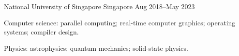 \begin{cventries}
	{National University of Singapore} %
	{Singapore} %
	{Aug 2018--May 2023} %
	{
		\begin{cvitems} %
			\item Computer science: parallel computing; real-time computer graphics; operating systems; compiler design.
			\item Physics: astrophysics; quantum mechanics; solid-state physics.
		\end{cvitems}
	}

\end{cventries}
